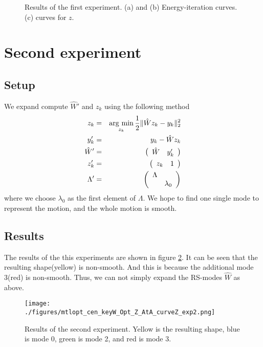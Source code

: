 \documentclass[9pt,twocolumn]{extarticle}
\newcommand{\argmin}{\operatornamewithlimits{arg\ min}}
\begin{document}
\begin{figure}
  \centering




  \caption{Results of the first experiment. (a) and (b) Energy-iteration
    curves. (c) curves for $z$.}
  \label{opt-6}
\end{figure}

\section{Second experiment}
\subsection{Setup}
We expand compute $\hat{W}'$ and $z_k$ using the following method 
\begin{eqnarray*}
  z_{k} &=& \argmin_{z_{k}} \frac{1}{2}\|\hat{W}z_k-y_k\|_2^2   \\
  y_k' &=& y_k - \hat{W}z_k\\
  \hat{W}' &=& \left( \begin{array}{ccc}
      \hat{W} &y_k'
    \end{array} \right)\\
  z_k' &=& \left( \begin{array}{ccc}
      z_k & 1
    \end{array} \right)\\
  \Lambda' &=& \left( \begin{array}{ccc}
      \Lambda & \\
      & \lambda_0
    \end{array} \right)
\end{eqnarray*}
where we choose $\lambda_0$ as the first element of $\Lambda$. We hope to find
one single mode to represent the motion, and the whole motion is smooth.
\subsection{Results}
The results of the this experiments are shown in figure \ref{exp2}. It can be
seen that the resulting shape(yellow) is non-smooth. And this is because the
additional mode 3(red) is non-smooth. Thus, we can not simply expand the
RS-modes $\hat{W}$ as above.

\begin{figure}
  \centering
  \texttt{[image: ./figures/mtlopt\_cen\_keyW\_Opt\_Z\_AtA\_curveZ\_exp2.png]}
  \caption{Results of the second experiment. Yellow is the resulting shape, blue
  is mode 0, green is mode 2, and red is mode 3.}
  \label{exp2}
\end{figure}
\end{document}

